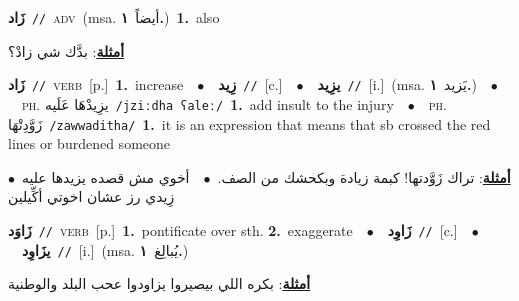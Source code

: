 \documentclass[10pt,a4paper,twoside]{article} %
\begin{document}
\begin{multicols}{2}
{\setlength\topsep{0pt}\textbf{\foreignlanguage{arabic}{زَاد}}\ {\color{gray}\texttt{//}\color{black}}\ \textsc{adv}\ \color{gray}(msa. \foreignlanguage{arabic}{أيضاً}~\foreignlanguage{arabic}{\textbf{١.}})\color{black}\ \textbf{1.}~also\  \begin{flushright}\color{gray}\foreignlanguage{arabic}{\textbf{\underline{\foreignlanguage{arabic}{أمثلة}}}: بدَّك شي زادْ؟}\end{flushright}\color{black}} \vspace{2mm}

{\setlength\topsep{0pt}\textbf{\foreignlanguage{arabic}{زَاد}}\ {\color{gray}\texttt{//}\color{black}}\ \textsc{verb}\ [p.]\ \textbf{1.}~increase\ \ $\bullet$\ \ \setlength\topsep{0pt}\textbf{\foreignlanguage{arabic}{زِيد}}\ {\color{gray}\texttt{//}\color{black}}\ [c.]\ \ $\bullet$\ \ \setlength\topsep{0pt}\textbf{\foreignlanguage{arabic}{يزِيد}}\ {\color{gray}\texttt{//}\color{black}}\ [i.]\ \color{gray}(msa. \foreignlanguage{arabic}{يَزيد}~\foreignlanguage{arabic}{\textbf{١.}})\color{black}\ \ $\bullet$\ \ \textsc{ph.} \color{gray} \foreignlanguage{arabic}{يزِيدْهَا عَلَيه}\color{black}\ {\color{gray}\texttt{/{\sffamily jziːdha ʕaleː}/}\color{black}}\ \textbf{1.}~add insult to the injury\ \ $\bullet$\ \ \textsc{ph.} \color{gray} \foreignlanguage{arabic}{زَوَّدِتْهَا}\color{black}\ {\color{gray}\texttt{/{\sffamily zawwaditha}/}\color{black}}\ \textbf{1.}~it is an expression that means that sb crossed the red lines or burdened someone\  \begin{flushright}\color{gray}\foreignlanguage{arabic}{\textbf{\underline{\foreignlanguage{arabic}{أمثلة}}}: تراك زَوَّدتها! كبمة زيادة وبكحشك من الصف.\ $\bullet$\ \  أخوي مش قصده يزيدها عليه\ $\bullet$\ \  زِيدي رز عشان اخوتي أكِّيلين}\end{flushright}\color{black}} \vspace{2mm}

{\setlength\topsep{0pt}\textbf{\foreignlanguage{arabic}{زَاوَد}}\ {\color{gray}\texttt{//}\color{black}}\ \textsc{verb}\ [p.]\ \textbf{1.}~pontificate over sth.  \textbf{2.}~exaggerate\ \ $\bullet$\ \ \setlength\topsep{0pt}\textbf{\foreignlanguage{arabic}{زَاوِد}}\ {\color{gray}\texttt{//}\color{black}}\ [c.]\ \ $\bullet$\ \ \setlength\topsep{0pt}\textbf{\foreignlanguage{arabic}{يزَاوِد}}\ {\color{gray}\texttt{//}\color{black}}\ [i.]\ \color{gray}(msa. \foreignlanguage{arabic}{يُبالِغ}~\foreignlanguage{arabic}{\textbf{١.}})\color{black}\  \begin{flushright}\color{gray}\foreignlanguage{arabic}{\textbf{\underline{\foreignlanguage{arabic}{أمثلة}}}: بكره اللي بيصيروا يزاودوا عحب البلد والوطنية}\end{flushright}\color{black}} \vspace{2mm}


\end{multicols}
\end{document}
